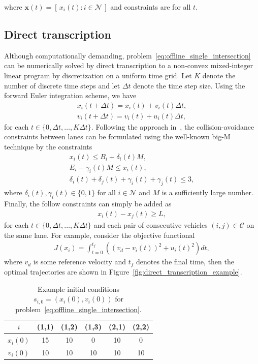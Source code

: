 \documentclass[a4paper]{article}
\theoremstyle{definition}
\theoremstyle{plain}
\begin{document}
where $\mathbf{x}(t) = [\, x_{i}(t) : i \in \mathcal{N} \,]$ and constraints are
for all $t$.

\subsection*{Direct transcription}

Although computationally demanding,
problem~\eqref{eq:offline_single_intersection} can be numerically solved by
direct transcription to a non-convex mixed-integer linear program by
discretization on a uniform time grid. Let $K$ denote the number of discrete
time steps and let $\Delta t$ denote the time step size.
%
Using the forward Euler integration scheme, we have
\begin{align*}
  x_{i}(t + \Delta t) = x_{i}(t) + v_{i}(t) \Delta t , \\
  v_{i}(t + \Delta t) = v_{i}(t) + u_{i}(t) \Delta t ,
\end{align*}
for each $t \in \{0, \Delta t, \dots, K \Delta t\}$. Following the approach
in~\cite{hultApproximateSolutionOptimal2015}, the collision-avoidance
constraints between lanes can be formulated using the well-known big-M technique
by the constraints
\begin{align*}
  x_{i}(t) \leq B_{i} + \delta_{i}(t) M , \\
  E_{i} - \gamma_{i}(t) M \leq x_{i}(t) , \\
  \delta_{i}(t) + \delta_{j}(t) + \gamma_{i}(t) + \gamma_{j}(t) \leq 3 ,
\end{align*}
where $\delta_{i}(t), \gamma_{i}(t) \in \{ 0, 1 \}$ for all $i \in \mathcal{N}$ and $M$ is a
sufficiently large number.
%
Finally, the follow constraints can simply be added as
\begin{align*}
  x_{i}(t) - x_{j}(t) \geq L ,
\end{align*}
for each $t \in \{0, \Delta t, \dots, K \Delta t\}$ and each pair of consecutive
vehicles $(i, j) \in \mathcal{C}$ on the same lane.
%
For example, consider the objective functional
\begin{align*}
  J(x_{i}) = \int_{t=0}^{t_{f}} \left( {(v_{d} - v_{i}(t))}^{2} + {u_{i}(t)}^{2} \right) dt ,
\end{align*}
where $v_{d}$ is some reference velocity and $t_{f}$ denotes the final time,
then the optimal trajectories are shown in
Figure~\ref{fig:direct_transcription_example}.

\begin{table}[H]
  \centering
\begin{tabular}{ c | c c c | c c }
  $i$  & (1,1) & (1,2) & (1,3) & (2,1) & (2,2) \\
  \hline
  $x_{i}(0)$ & 15 & 10 &  0 & 10 &  0 \\
  $v_{i}(0)$ & 10 & 10 & 10 & 10 & 10 \\
\end{tabular}
\caption{Example initial conditions $s_{i,0} = (x_{i}(0), v_{i}(0))$ for
  problem~\eqref{eq:offline_single_intersection}.}
\label{tab:hult_parameters}
\end{table}
\end{document}
